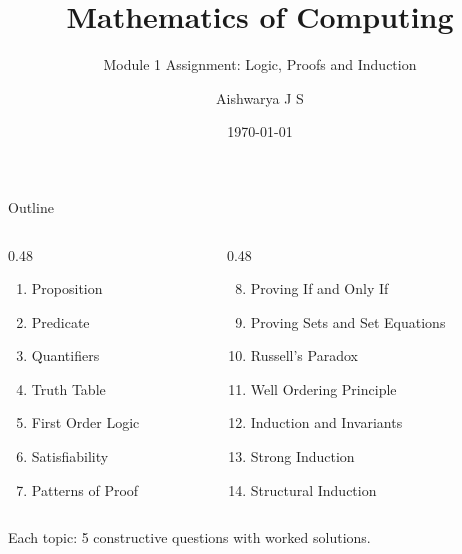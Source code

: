 \documentclass[aspectratio=169,10pt]{beamer}
\title{Mathematics of Computing}
\subtitle{Module 1 Assignment: Logic, Proofs and Induction}
\author{Aishwarya J S}
\institute{M.Tech CSE (Artificial Intelligence and Data Science)}
\date{\today}
\begin{document}
\begin{frame}
  \titlepage
\end{frame}

\begin{frame}{Outline}
\small
\begin{columns}[t]
\begin{column}{0.48\textwidth}
\begin{enumerate}
  \item Proposition
  \item Predicate
  \item Quantifiers
  \item Truth Table
  \item First Order Logic
  \item Satisfiability
  \item Patterns of Proof
\end{enumerate}
\end{column}
\begin{column}{0.48\textwidth}
\begin{enumerate}\setcounter{enumi}{7}
  \item Proving If and Only If
  \item Proving Sets and Set Equations
  \item Russell's Paradox
  \item Well Ordering Principle
  \item Induction and Invariants
  \item Strong Induction
  \item Structural Induction
\end{enumerate}
\end{column}
\end{columns}
\medskip
\centering Each topic: 5 constructive questions with worked solutions.
\end{frame}
\end{document}
